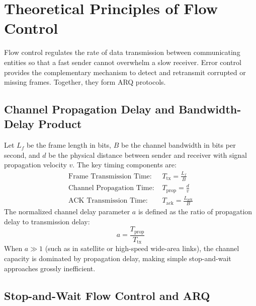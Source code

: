\documentclass[11pt,a4paper]{article}
\begin{document}
\section{Theoretical Principles of Flow Control}

Flow control regulates the rate of data transmission between communicating entities so that a fast sender cannot overwhelm a slow receiver. Error control provides the complementary mechanism to detect and retransmit corrupted or missing frames. Together, they form ARQ protocols.

\subsection{Channel Propagation Delay and Bandwidth-Delay Product}

Let \(L_f\) be the frame length in bits, \(B\) be the channel bandwidth in bits per second, and \(d\) be the physical distance between sender and receiver with signal propagation velocity \(v\). The key timing components are:
\begin{align}
    \text{Frame Transmission Time: } & T_{\text{tx}} = \frac{L_f}{B} \\
    \text{Channel Propagation Time: } & T_{\text{prop}} = \frac{d}{v} \\
    \text{ACK Transmission Time: } & T_{\text{ack}} = \frac{L_{\text{ack}}}{B}
\end{align}
The normalized channel delay parameter \(a\) is defined as the ratio of propagation delay to transmission delay:
\begin{equation}
    a = \frac{T_{\text{prop}}}{T_{\text{tx}}}
\end{equation}
When \(a \gg 1\) (such as in satellite or high-speed wide-area links), the channel capacity is dominated by propagation delay, making simple stop-and-wait approaches grossly inefficient.

\subsection{Stop-and-Wait Flow Control and ARQ}
\end{document}
